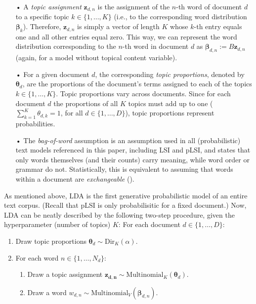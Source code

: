 \documentclass[12pt]{article}
\begin{document}
\begin{itemize}
\vspace{-0.25cm}
\item[•] A \textit{topic assignment} $\boldsymbol{z}_{d,n}$ is the assignment of the $n$-th word of document $d$ to a specific topic $k \in \{1,\dots,K\}$ (i.e., to the corresponding word distribution $\boldsymbol{\beta}_k$). Therefore, $\boldsymbol{z}_{d,n}$ is simply a vector of length $K$ whose $k$-th entry equals one and all other entries equal zero. This way, we can represent the word distribution corresponding to the $n$-th word in document $d$ as $\boldsymbol{\beta}_{d,n}:=B\boldsymbol{z}_{d,n}$ (again, for a model without topical content variable).
\vspace{-0.25cm}
\item[•] For a given document $d$, the corresponding \textit{topic proportions}, denoted by $\boldsymbol{\theta}_d$, are the proportions of the document's terms assigned to each of the topics $k \in \{1,\dots,K\}$. Topic proportions vary across documents. Since for each document $d$ the proportions of all $K$ topics must add up to one ($\sum_{k=1}^{K}\theta_{d,k}=1$, for all $d \in \{1,\dots,D\}$), topic proportions represent probabilities.
\vspace{-0.25cm}
\item[•] The \textit{bag-of-word} assumption is an assumption used in all (probabilistic) text models referenced in this paper, including LSI and pLSI, and states that only words themselves (and their counts) carry meaning, while word order or grammar do not. Statistically, this is equivalent to assuming that words within a document are \textit{exchangeable} (\citealp{aldous1985exchangeability}).

\end{itemize}

As mentioned above, LDA is the first generative probabilistic model of an entire text corpus. (Recall that pLSI is only probabilisitic for a fixed document.) Now, LDA can be neatly described by the following two-step procedure, given the hyperparameter (number of topics) $K$:
\vspace{0.25cm}
\noindent
For each document $d \in \{1,\dots,D\}$:

\begin{enumerate}[{1)}]
\vspace{-0.25cm}
\item Draw topic proportions $\boldsymbol{\theta}_d \sim \text{Dir}_K(\alpha)$.
\vspace{-0.25cm}
\item For each word $n \in \{1,\dots,N_d\}$:
	\begin{enumerate}[{a)}]
	\vspace{-0.25cm}    
    \item Draw a topic assignment $\boldsymbol{z_{d,n}} \sim \text{Multinomial}_K(\boldsymbol{\theta}_d)$.
	\vspace{-0.25cm}    
    \item Draw a word $w_{d,n} \sim \text{Multinomial}_V(\boldsymbol{\beta}_{d,n})$.
	\end{enumerate}
\end{enumerate}
\end{document}

